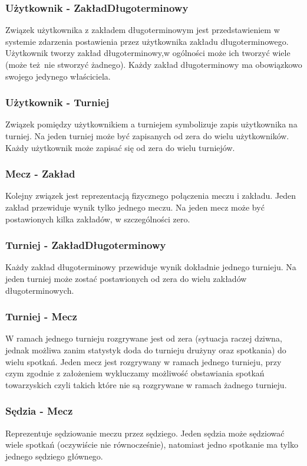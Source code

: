\documentclass{mwrep}[15pt]
\begin{document}
\subsubsection{Użytkownik - ZakładDługoterminowy}
Związek użytkownika z zakładem długoterminowym jest przedstawieniem w systemie zdarzenia postawienia przez użytkownika zakładu długoterminowego. Użytkownik tworzy zakład długoterminowy,w ogólności może ich tworzyć wiele (może też nie stworzyć żadnego). Każdy zakład długoterminowy ma obowiązkowo swojego jedynego właściciela.

\subsubsection{Użytkownik - Turniej}
Związek pomiędzy użytkownikiem a turniejem symbolizuje zapis użytkownika na turniej. Na jeden turniej może być zapisanych od zera do wielu użytkowników. Każdy użytkownik może zapisać się od zera do wielu turniejów.

\subsubsection{Mecz - Zakład} 
Kolejny związek jest reprezentacją fizycznego połączenia meczu i zakładu. Jeden zakład przewiduje wynik
tylko jednego meczu. Na jeden mecz może być postawionych kilka zakładów, w szczególności zero.

\subsubsection{Turniej - ZakładDługoterminowy}
Każdy zakład długoterminowy przewiduje wynik dokładnie jednego turnieju. Na jeden turniej może zostać
postawionych od zera do wielu zakładów długoterminowych.

\subsubsection{Turniej - Mecz}
W ramach jednego turnieju rozgrywane jest od zera (sytuacja raczej dziwna, jednak możliwa zanim statystyk doda do turnieju drużyny oraz spotkania) do wielu
spotkań. Jeden mecz jest rozgrywany w ramach jednego turnieju, przy czym zgodnie z założeniem wykluczamy możliwość
obstawiania spotkań towarzyskich czyli takich które nie są rozgrywane w ramach żadnego turnieju.

\subsubsection{Sędzia - Mecz}
Reprezentuje sędziowanie meczu przez sędziego. Jeden sędzia może sędziować wiele spotkań (oczywiście nie równocześnie), natomiast 
jedno spotkanie ma tylko jednego sędziego głównego.
\end{document}
